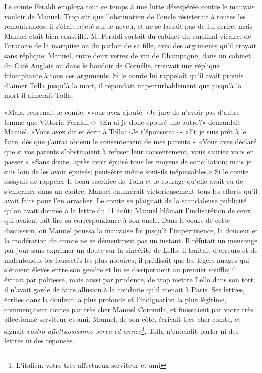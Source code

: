 Le comte Feraldi employa tout ce temps à une lutte désespérée contre le mauvais vouloir de Manuel. Trop sûr que l'obstination de l'oncle résisterait à toutes les remontrances, il s'était rejeté sur le neveu, et ne se lassait pas de lui écrire; mais Manuel était bien conseillé. M. Feraldi sortait du cabinet du cardinal-vicaire, de l'oratoire de la marquise ou du parloir de sa fille, avec des arguments qu'il croyait sans réplique; Manuel, entre deux verres de vin de Champagne, dans un cabinet du Café Anglais ou dans le boudoir de Cornélie, trouvait une réplique triomphante à tous ces arguments. Si le comte lui rappelait qu'il avait promis d'aimer Tolla jusqu'à la mort, il répondait imperturbablement que jusqu'à la mort il aimerait Tolla.

«Mais, reprenait le comte, «vous avez ajouté: ‹Je jure de n'avoir pas d'autre femme que Vittoria Feraldi.›» «En ai-je donc épousé une autre?» demandait Manuel. «Vous avez dit et écrit à Tolla: ‹Je t'épouserai.›» «Et je suis prêt à le faire, dès que j'aurai obtenu le consentement de mes parents.» «Vous avez déclaré que si vos parents s'obstinaient à refuser leur consentement, vous sauriez vous en passer.» «Sans doute, après avoir épuisé tous les moyens de conciliation; mais je suis loin de les avoir épuisés; peut-être même sont-ils inépuisables.» Si le comte essayait de rappeler le beau sacrifice de Tolla et le courage qu'elle avait eu de s'enfermer dans un cloître, Manuel énumérait victorieusement tous les efforts qu'il avait faits pour l'en arracher. Le comte se plaignait de la scandaleuse publicité qu'on avait donnée à la lettre du 11 août; Manuel blâmait l'indiscrétion de ceux qui avaient fait lire sa correspondance à son oncle. Dans le cours de cette discussion, où Manuel poussa la mauvaise foi jusqu'à l'impertinence, la douceur et la modération du comte ne se démentirent pas un instant. Il réfutait un mensonge par jour sans exprimer un doute sur la sincérité de Lello; il traitait d'erreurs et de malentendus les faussetés les plus notoires; il prédisait que les légers nuages qui s'étaient élevés entre son gendre et lui se dissiperaient au premier souffle; il évitait par politesse, mais aussi par prudence, de trop mettre Lello dans son tort; il n'avait garde de faire allusion à la conduite qu'il menait à Paris. Ses lettres, écrites dans la douleur la plus profonde et l'indignation la plus légitime, commençaient toutes par très cher Manuel Coromila, et finissaient par votre très affectionné serviteur et ami. Manuel, de son côté, écrivait très cher comte, et signait \emph{vostro affettuosissimo servo ed amico\footnote{
L'italien: votre très affectueux serviteur et ami
}}. Tolla n'entendit parler ni des lettres ni des réponses.

